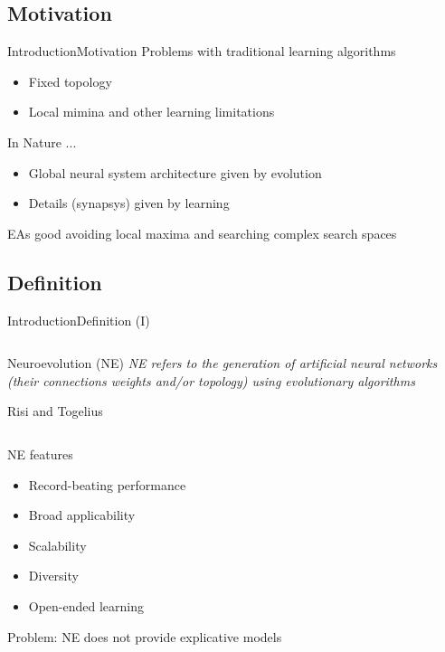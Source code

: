 \documentclass[10pt,compress]{beamer} %
\begin{document}
\subsection{Motivation}
\begin{frame}{Introduction}{Motivation}
	Problems with traditional learning algorithms
	\begin{itemize}
        \item Fixed topology
        \item Local mimina and other learning limitations
	\end{itemize}
	In Nature ...
	\begin{itemize}
        \item Global neural system architecture given by evolution
        \item Details (synapsys) given by learning
	\end{itemize}
    EAs good avoiding local maxima and searching complex search spaces
\end{frame}

\subsection{Definition}
\begin{frame}{Introduction}{Definition (I)}
    \begin{columns}
       \vspace{-0.3cm}
       \begin{block}{Neuroevolution (NE)}
            \textit{NE refers to the generation of artificial neural networks (their connections weights and/or topology) using evolutionary algorithms}

            \vspace{-0.2cm}
            \begin{flushright} Risi and Togelius\end{flushright}
        \end{block}
    \end{columns}

    NE features
	\begin{itemize}
        \item Record-beating performance
        \item Broad applicability
        \item Scalability
        \item Diversity
        \item Open-ended learning
	\end{itemize}
    Problem: NE does not provide explicative models
\end{frame}
\end{document}
